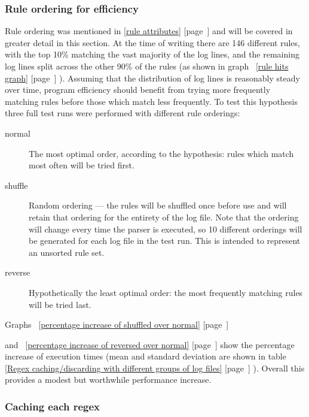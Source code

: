 \documentclass[a4paper,12pt,draft]{article}
\newcommand{\refwithpage}[1]{%
    \empty{}\ref{#1} [page~\pageref{#1}]%
}
\newcommand{\sectionref}[1]{%
    \textsection{}\refwithpage{#1}%
}
\newcommand{\numberOFrules}[0]{%
    146%
}
\begin{document}
\subsubsection{Rule ordering for efficiency}

\label{rule ordering for efficiency}

Rule ordering was mentioned in \sectionref{rule attributes} and will be
covered in greater detail in this section.  At the time of writing there
are \numberOFrules{} different rules, with the top 10\% matching the vast
majority of the log lines, and the remaining log lines split across the
other 90\% of the rules (as shown in graph~\refwithpage{rule hits graph}).
Assuming that the distribution of log lines is reasonably steady over time,
program efficiency should benefit from trying more frequently matching
rules before those which match less frequently.  To test this hypothesis
three full test runs were performed with different rule orderings:

\begin{description}

    \item [normal]  The most optimal order, according to the hypothesis:
        rules which match most often will be tried first.

    \item [shuffle] Random ordering --- the rules will be shuffled once
        before use and will retain that ordering for the entirety of the
        log file.  Note that the ordering will change every time the parser
        is executed, so 10 different orderings will be generated for each
        log file in the test run.  This is intended to represent an
        unsorted rule set.

    \item [reverse] Hypothetically the least optimal order: the most
        frequently matching rules will be tried last.

\end{description}

Graphs~\refwithpage{percentage increase of shuffled over normal}
and~\refwithpage{percentage increase of reversed over normal} show the
percentage increase of execution times (mean and standard deviation are
shown in table~\refwithpage{Regex caching/discarding with different groups
of log files}).  Overall this provides a modest but worthwhile
performance increase.

\subsubsection{Caching each regex}
\end{document}
